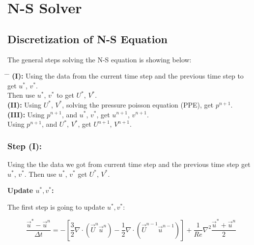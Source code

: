 \documentclass[12pt]{article}
\begin{document}



\newpage
\section{N-S Solver}
\subsection{Discretization of N-S Equation}
The general steps solving the N-S equation is showing below:

\begin{tabbing}
\hspace*{2cm} \= \hspace*{2.5cm} \= \kill
\textbf{(I):} \> Using the data from the current time step and the previous time step to get $u^{*}$, $v^{*}$. \\
\> Then use $u^{*}$, $v^{*}$ to get $U^{*}$, $V^{*}$.\\


\textbf{(II):} \> Using $U^{*}$, $V^{*}$, solving the pressure poisson equation (PPE),  get $p^{n+1}$.\\


\textbf{(III):} \> Using $p^{n+1}$, and $u^{*}$, $v^{*}$, get $u^{n+1}$, $v^{n+1}$. \\
\> Using $p^{n+1}$, and $U^{*}$, $V^{*}$, get $U^{n+1}$, $V^{n+1}$.
\end{tabbing}



\subsubsection{Step (I):}
Using the the data we got from current time step and the previous time step get $u^{*}$, $v^{*}$.
    Then use $u^{*}$, $v^{*}$ get $U^{*}$, $V^{*}$.



\noindent \textbf{Update $u^*, v^*$:}


The first step is going to update $u^*, v^*$:


\begin{equation}
    \frac{\vec{u}^{*} - \vec{u}^{n}}{\Delta t} = -[\frac{3}{2} \nabla \cdot (\vec{U}^n \vec{u}^{n}) - \frac{1}{2} \nabla \cdot (\vec{U}^{n-1} \vec{u}^{n-1}) ] + \frac{1}{Re} \nabla^{2} \frac{\vec{u}^*+\vec{u}^{n}}{2}
\end{equation}
    
\end{document}
